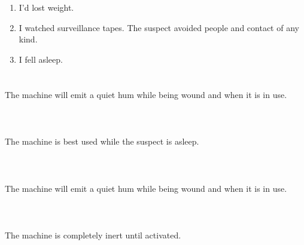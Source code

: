 \documentclass{article}
\begin{document}
    \newpage
    
    \section{}
    
    \begin{enumerate}
    
    \item I'd lost weight.\\
    
    \item I watched surveillance tapes. The suspect avoided people and contact of any kind.\\
    
    \item I fell asleep.\\
    
    \end{enumerate}
     
    \newpage
    
    \section{}
    The machine will emit a quiet hum while being wound and when it is in use.\\\\ 
    \newpage
    
    \section{}
    The machine is best used while the suspect is asleep.\\\\ 
    \newpage
    
    \section{}
    The machine will emit a quiet hum while being wound and when it is in use.\\\\ 
    \newpage
    
    \section{}
    The machine is completely inert until activated.\\\\ 
    \newpage
    
\end{document}
